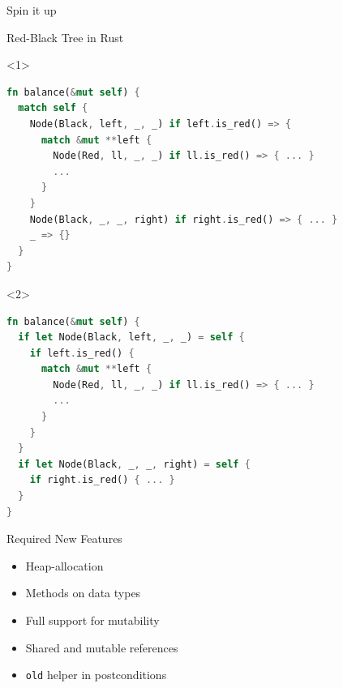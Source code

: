 \begin{frame}{Spin it up}

\end{frame}

\begin{frame}[fragile]{Red-Black Tree in Rust}
\begin{onlyenv}<1>
\begin{lstlisting}[language=Rust]
fn balance(&mut self) {
  match self {
    Node(Black, left, _, _) if left.is_red() => {
      match &mut **left {
        Node(Red, ll, _, _) if ll.is_red() => { ... }
        ...
      }
    }
    Node(Black, _, _, right) if right.is_red() => { ... }
    _ => {}
  }
}
\end{lstlisting}
\end{onlyenv}
\begin{onlyenv}<2>
\begin{lstlisting}[language=Rust, caption={Solved bug in balance function}]
fn balance(&mut self) {
  if let Node(Black, left, _, _) = self {
    if left.is_red() {
      match &mut **left {
        Node(Red, ll, _, _) if ll.is_red() => { ... }
        ...
      }
    }
  }
  if let Node(Black, _, _, right) = self {
    if right.is_red() { ... }
  }
}
\end{lstlisting}
\end{onlyenv}
\end{frame}

\begin{frame}{Required New Features}
\begin{itemize}
\item Heap-allocation
\item Methods on data types
\item Full support for mutability
\item Shared and mutable references
\item \lstinline!old! helper in postconditions
\end{itemize}
\end{frame}

